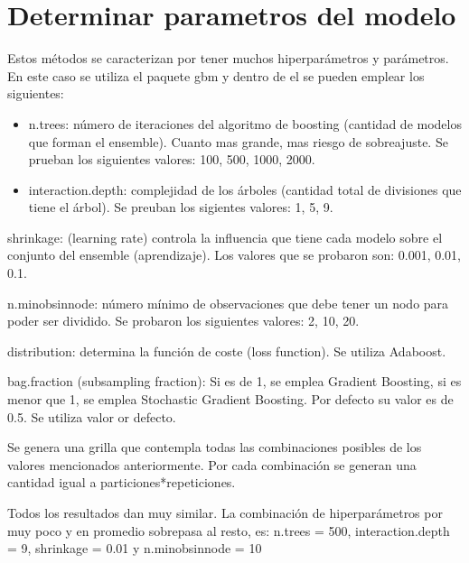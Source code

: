 \documentclass[]{article}
\begin{document}
\hypertarget{determinar-parametros-del-modelo-2}{%
\section{Determinar parametros del
modelo}\label{determinar-parametros-del-modelo-2}}

Estos métodos se caracterizan por tener muchos hiperparámetros y
parámetros. En este caso se utiliza el paquete gbm y dentro de el se
pueden emplear los siguientes:

\begin{itemize}
\item
  n.trees: número de iteraciones del algoritmo de boosting (cantidad de
  modelos que forman el ensemble). Cuanto mas grande, mas riesgo de
  sobreajuste. Se prueban los siguientes valores: 100, 500, 1000, 2000.
\item
  interaction.depth: complejidad de los árboles (cantidad total de
  divisiones que tiene el árbol). Se preuban los sigientes valores: 1,
  5, 9.
\end{itemize}

shrinkage: (learning rate) controla la influencia que tiene cada modelo
sobre el conjunto del ensemble (aprendizaje). Los valores que se
probaron son: 0.001, 0.01, 0.1.

n.minobsinnode: número mínimo de observaciones que debe tener un nodo
para poder ser dividido. Se probaron los siguientes valores: 2, 10, 20.

distribution: determina la función de coste (loss function). Se utiliza
Adaboost.

bag.fraction (subsampling fraction): Si es de 1, se emplea Gradient
Boosting, si es menor que 1, se emplea Stochastic Gradient Boosting. Por
defecto su valor es de 0.5. Se utiliza valor or defecto.

Se genera una grilla que contempla todas las combinaciones posibles de
los valores mencionados anteriormente. Por cada combinación se generan
una cantidad igual a particiones*repeticiones.

Todos los resultados dan muy similar. La combinación de hiperparámetros
por muy poco y en promedio sobrepasa al resto, es: n.trees = 500,
interaction.depth = 9, shrinkage = 0.01 y n.minobsinnode = 10
\end{document}
